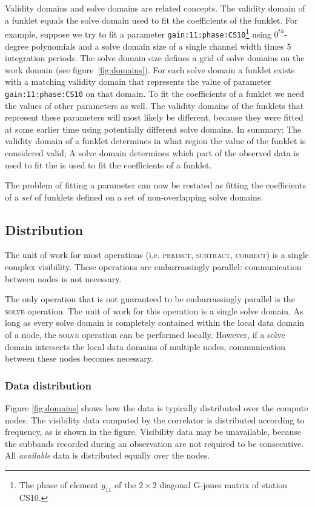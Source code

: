 \documentclass[10pt]{lofar}
\newcommand{\predict}{\textsc{predict}\xspace}
\newcommand{\solve}{\textsc{solve}\xspace}
\newcommand{\subtract}{\textsc{subtract}\xspace}
\newcommand{\correct}{\textsc{correct}\xspace}
\begin{document}
Validity domains and solve domains are related concepts. The validity domain of
a funklet equals the solve domain used to fit the coefficients of the funklet.
For example, suppose we try to fit a parameter
\texttt{gain:11:phase:CS10}\footnote{The phase of element $g_{11}$ of the $2
\times 2$ diagonal G-jones matrix of station CS10.} using $0^{th}$-degree
polynomials and a solve domain size of a single channel width times 5
integration periods. The solve domain size defines a grid of solve domains on
the work domain (see figure~\ref{fig:domains}). For each solve domain a funklet
exists with a matching validity domain that represents the value of parameter
\texttt{gain:11:phase:CS10} on that domain. To fit the coefficients of a funklet
we need the values of other parameters as well. The validity domains of the
funklets that represent these parameters will most likely be different, because
they were fitted at some earlier time using potentially different solve domains.
In summary: The validity domain of a funklet determines in what region the value
of the funklet is considered valid; A solve domain determines which part of the
observed data is used to fit the is used to fit the coefficients of a funklet.

The problem of fitting a parameter can now be restated as fitting the
coefficients of a \emph{set} of funklets defined on a set of non-overlapping
solve domains.

\subsection{Distribution}
\label{subsec:distribution}

The unit of work for most operations (i.e. \predict, \subtract, \correct) is a
single complex visibility. These operations are embarrassingly parallel:
communication between nodes is not necessary.

The only operation that is not guaranteed to be embarrassingly parallel is the
\solve operation. The unit of work for this operation is a single solve domain.
As long as every solve domain is completely contained within the local data
domain of a node, the \solve operation can be performed locally. However, if a
solve domain intersects the local data domains of multiple nodes, communication
between these nodes becomes necessary.

\subsubsection{Data distribution}
\label{subsubsec:distribution-data}
Figure \ref{fig:domains} shows how the data is typically distributed over the
compute nodes. The visibility data computed by the correlator is distributed
according to frequency, as is shown in the figure. Visibility data may be
unavailable, because the subbands recorded during an observation are not
required to be consecutive. All \emph{available} data is distributed equally
over the nodes. 
\end{document}
